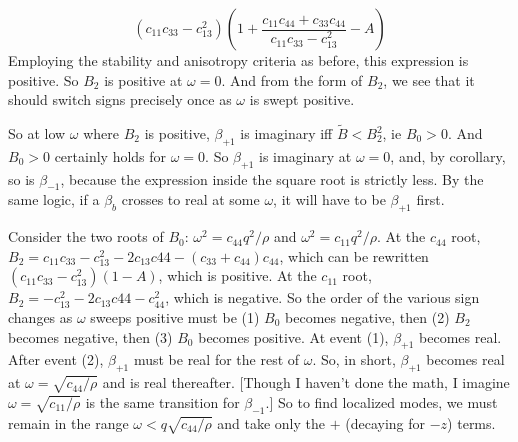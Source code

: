 \documentclass{article}
\begin{document}
\begin{equation}
\left(c_{11}c_{33}-c_{13}^2\right)\left( 1+\frac{c_{11}c_{44}+c_{33}c_{44}}{c_{11}c_{33}-c_{13}^2}-A \right)
\end{equation}
Employing the stability and anisotropy criteria as before, this expression is positive.  So $B_2$ is positive at $\omega=0$. And from the form of $B_2$, we see that it should switch signs precisely once as $\omega$ is swept positive.

So at low $\omega$ where $B_2$ is positive, 
$\beta_{+1}$ is imaginary iff
$\tilde B < B_2^2$, ie $B_0>0$.
And $B_0>0$ certainly holds for $\omega=0$.  So $\beta_{+1}$ is imaginary at $\omega=0$, and, by corollary, so is $\beta_{-1}$, because the expression inside the square root is strictly less.  By the same logic, if a $\beta_b$ crosses to real at some $\omega$, it will have to be $\beta_{+1}$ first.

Consider the two roots of $B_0$: $\omega^2=c_{44}q^2/\rho$ and $\omega^2=c_{11}q^2/\rho$.  At the $c_{44}$ root, $B_2=c_{11}c_{33}-c_{13}^2-2c_{13}c{44}-(c_{33}+c_{44})c_{44}$, which can be rewritten $\left(c_{11}c_{33}-c_{13}^2\right)\left( 1-A \right)$, which is positive.  At the $c_{11}$ root, $B_2=-c_{13}^2-2c_{13}c{44}-c_{44}^2$, which is negative.  So the order of the various sign changes as $\omega$ sweeps positive must be (1) $B_0$ becomes negative, then (2) $B_2$ becomes negative, then (3) $B_0$ becomes positive.  At event (1), $\beta_{+1}$ becomes real. After event (2), $\beta_{+1}$ must be real for the rest of $\omega$.  So, in short, $\beta_{+1}$ becomes real at $\omega=\sqrt{c_{44}/\rho}$ and is real thereafter.  [Though I haven't done the math, I imagine $\omega=\sqrt{c_{11}/\rho}$ is the same transition for $\beta_{-1}$.] So to find localized modes, we must remain in the range $\omega<q\sqrt{c_{44}/\rho}$ and take only the $+$ (decaying for $-z$) terms.
\end{document}
